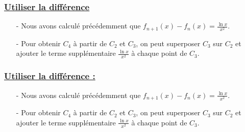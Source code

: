 \documentclass[12pt]{article}
\begin{document}
\begin{enumerate}
\subsubsection*{\underline{ Utiliser la différence }}
\begin{itemize}
    \item[-] Nous avons calculé précédemment que \( f_{n+1}(x) - f_n(x) = \frac{\ln x}{x^2} \).
    \item[-] Pour obtenir \( C_4 \) à partir de \( C_2 \) et \( C_3 \), on peut superposer \( C_3 \) sur \( C_2 \) et ajouter le terme supplémentaire \(\frac{\ln x}{x^2}\) à chaque point de \( C_3 \).
\end{itemize}

\end{enumerate}
\subsubsection*{\underline{Utiliser la différence :}}

\begin{itemize}
\item[-] Nous avons calculé précédemment que \( f_{n+1}(x) - f_n(x) = \frac{\ln x}{x^2} \).
   
\item[-] Pour obtenir \( C_4 \) à partir de \( C_2 \) et \( C_3 \), on peut superposer \( C_3 \) sur \( C_2 \) et ajouter le terme supplémentaire \(\frac{\ln x}{x^2}\) à chaque point de \( C_3 \).
\end{itemize}
\end{document}
